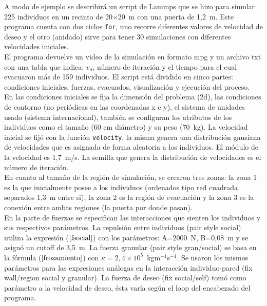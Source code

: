\label{appendix:script}

A modo de ejemplo se describirá un script de Lammps que se hizo para simular 225 individuos en un recinto de 20$\times$20~m con una puerta de 1,2~m. Este programa cuenta con dos ciclos {\tt for}, uno recorre diferentes valores de velocidad de deseo y el otro (anidado) sirve para tener 30 simulaciones con diferentes velocidades iniciales. \\

El programa devuelve un video de la simulación en formato mpg y un archivo txt con una tabla que indica: $v_d$, número de iteración y el tiempo para el cual evacuaron más de 159 individuos.
El script está dividido en cinco partes: condiciones iniciales, fuerzas, evacuados, visualización y ejecución del proceso.\\ 

En las condiciones iniciales se fija la dimensión del problema (2d), las condiciones de contorno (no periódicas en las coordenadas x e y), el sistema de unidades usado (sistema internacional), también se configuran los atributos de los individuos como el tamaño (60 cm diámetro) y su peso (70~kg). La velocidad inicial se fijó con la función {\tt velocity}, la misma genera una distribución gausiana de velocidades que es asignada de forma aleatoria a los individuos. El módulo de la velocidad es 1,7~m/s. La semilla que genera la distribución de velocidades es el número de iteración.\\

En cuanto al tamaño de la región de simulación, se crearon tres zonas: la zona 1 es la que inicialmente posee a los individuos (ordenados tipo red cuadrada separados 1,3~m entre si), la zona 2 es la región de evacuación y la zona 3 es la conexión entre ambas regiones (la puerta por donde pasan).\\

En la parte de fuerzas se especifican las interacciones que sienten los individuos y sus respectivos parámetros. La repulsión entre individuos (pair style social) utiliza la expresión ($\ref{fsocial}$) con los parámetros: A=2000~N, B=0,08~m y se asignó un cutoff de 3,5~m. La fuerza granular (pair style gran/social) se basa en la fórmula ($\ref{frozamiento}$) con $\kappa =2,4 \times 10^5$~kgm$^{-1}$s$^{-1}$. Se usaron los mismos parámetros para las expresiones análogas en la interacción individuo-pared (fix wall/region social y granular). La fuerza de deseo (fix social/self) tomó como parámetro a la velocidad de deseo, ésta varía según el loop del encabezado del programa. \\

